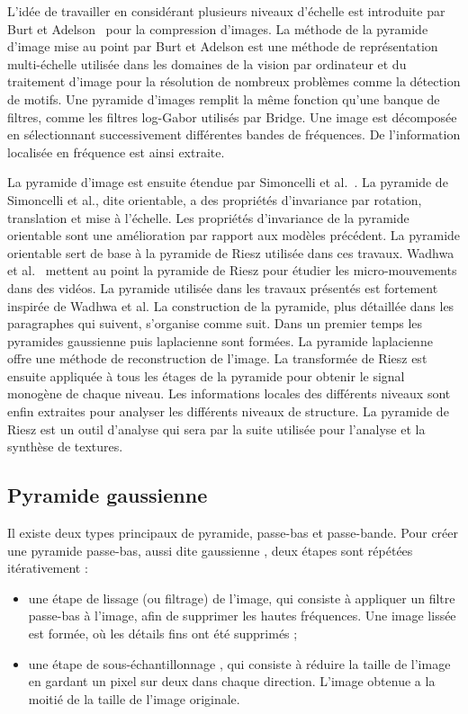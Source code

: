 L'idée de travailler en considérant plusieurs niveaux d'échelle est introduite par Burt et Adelson~\cite{burt_laplacian_1983} pour la compression d'images. La méthode de la pyramide d'image mise au point par Burt et Adelson est une méthode de représentation multi-échelle utilisée dans les domaines de la vision par ordinateur et du traitement d'image pour la résolution de nombreux problèmes comme la détection de motifs. Une pyramide d'images remplit la même fonction qu'une banque de filtres, comme les filtres log-Gabor utilisés par Bridge. Une image est décomposée en sélectionnant successivement différentes bandes de fréquences. De l'information localisée en fréquence est ainsi extraite.

\bigskip

La pyramide d'image est ensuite étendue par Simoncelli et al.~\cite{simoncelli_shiftable_1992}. La pyramide de Simoncelli et al., dite orientable, a des propriétés d'invariance par rotation, translation et mise à l'échelle. Les propriétés d'invariance de la pyramide orientable sont une amélioration par rapport aux modèles précédent. La pyramide orientable sert de base à la pyramide de Riesz utilisée dans ces travaux. Wadhwa et al.~\cite{wadhwa_phase_based_2013} mettent au point la pyramide de Riesz pour étudier les micro-mouvements dans des vidéos. La pyramide utilisée dans les travaux présentés est fortement inspirée de Wadhwa et al. La construction de la pyramide, plus détaillée dans les paragraphes qui suivent, s'organise comme suit. Dans un premier temps les pyramides gaussienne puis laplacienne sont formées. La pyramide laplacienne offre une méthode de reconstruction de l'image. La transformée de Riesz est ensuite appliquée à tous les étages de la pyramide pour obtenir le signal monogène de chaque niveau. Les informations locales des différents niveaux sont enfin extraites pour analyser les différents niveaux de structure. La pyramide de Riesz est un outil d'analyse qui sera par la suite utilisée pour l'analyse et la synthèse de textures.

\subsection{Pyramide gaussienne}

Il existe deux types principaux de pyramide, passe-bas et passe-bande. Pour créer une pyramide passe-bas, aussi dite \og gaussienne \fg, deux étapes sont répétées itérativement :

\bigskip

\begin{itemize}
    \item une étape de \og lissage \fg (ou filtrage) de l'image, qui consiste à appliquer un filtre passe-bas à l'image, afin de supprimer les hautes fréquences. Une image lissée est formée, où les détails fins ont été supprimés ;
    \item une étape de \og sous-échantillonnage \fg, qui consiste à réduire la taille de l'image en gardant un pixel sur deux dans chaque direction. L'image obtenue a la moitié de la taille de l'image originale.
\end{itemize}

